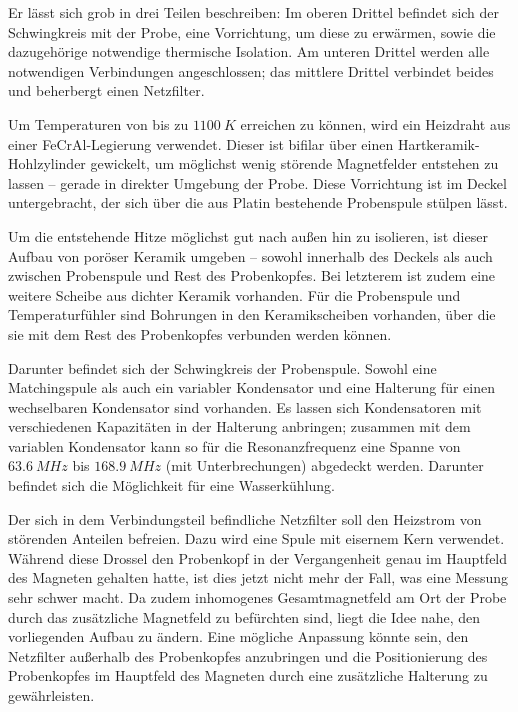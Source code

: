 Er lässt sich grob in drei Teilen beschreiben: Im oberen Drittel befindet sich der Schwingkreis mit der Probe, eine Vorrichtung, um diese zu erwärmen, sowie die dazugehörige notwendige thermische Isolation. Am unteren Drittel werden alle notwendigen Verbindungen angeschlossen; das mittlere Drittel verbindet beides und beherbergt einen Netzfilter.

Um Temperaturen von bis zu $\SI{1100}{K}$ erreichen zu können, wird ein Heizdraht aus einer FeCrAl-Legierung verwendet. Dieser ist bifilar über einen Hartkeramik-Hohlzylinder gewickelt, um möglichst wenig störende Magnetfelder entstehen zu lassen -- gerade in direkter Umgebung der Probe. Diese Vorrichtung ist im Deckel untergebracht, der sich über die aus Platin bestehende Probenspule stülpen lässt.

Um die entstehende Hitze möglichst gut nach außen hin zu isolieren, ist dieser Aufbau von poröser Keramik umgeben -- sowohl innerhalb des Deckels als auch zwischen Probenspule und Rest des Probenkopfes. Bei letzterem ist zudem eine weitere Scheibe aus dichter Keramik vorhanden. Für die Probenspule und Temperaturfühler sind Bohrungen in den Keramikscheiben vorhanden, über die sie mit dem Rest des Probenkopfes verbunden werden können.

Darunter befindet sich der Schwingkreis der Probenspule. Sowohl eine Match\-ing\-spu\-le als auch ein variabler Kondensator und eine Halterung für einen wechselbaren Kondensator sind vorhanden. Es lassen sich Kondensatoren mit verschiedenen Kapazitäten in der Halterung anbringen; zusammen mit dem variablen Kondensator kann so für die Resonanzfrequenz eine Spanne von $\SI{63,6}{MHz}$ bis $\SI{168,9}{MHz}$ (mit Unterbrechungen) abgedeckt werden. Darunter befindet sich die Möglichkeit für eine Wasserkühlung.

Der sich in dem Verbindungsteil befindliche Netzfilter soll den Heizstrom von störenden Anteilen befreien. Dazu wird eine Spule mit eisernem Kern verwendet. Während diese Drossel den Probenkopf in der Vergangenheit genau im Hauptfeld des Magneten gehalten hatte, ist dies jetzt nicht mehr der Fall, was eine Messung sehr schwer macht. Da zudem inhomogenes Gesamtmagnetfeld am Ort der Probe durch das zusätzliche Magnetfeld zu befürchten sind, liegt die Idee nahe, den vorliegenden Aufbau zu ändern. Eine mögliche Anpassung könnte sein, den Netzfilter außerhalb des Probenkopfes anzubringen und die Positionierung des Probenkopfes im Hauptfeld des Magneten durch eine zusätzliche Halterung zu gewährleisten.

